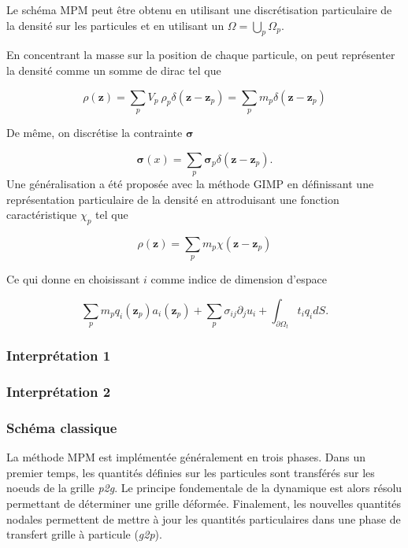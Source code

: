 Le schéma MPM peut être obtenu en utilisant une discrétisation particulaire de la densité sur les particules et en utilisant un  $\Omega = \bigcup_p \Omega_p$.

En concentrant la masse sur la position de chaque particule, on peut représenter la densité comme un somme de dirac tel que

\begin{equation*}
    \rho(\bm z) = \sum_p V_p~\rho_p \delta(\bm z - \bm z_p) = \sum_p m_p \delta(\bm z - \bm z_p)
\end{equation*}

De même, on discrétise la contrainte $\bm \sigma$

\begin{equation*}
    \bm \sigma(x) = \sum_p \bm \sigma_p \delta(\bm z - \bm z_p).
\end{equation*}
Une généralisation a été proposée avec la méthode GIMP \cite{bardenhagen_generalized_2004} en définissant une représentation particulaire de la densité en attroduisant une fonction caractéristique $\chi_p$ tel que

\begin{equation*}
    \rho(\bm z) = \sum_p m_p \chi(\bm z - \bm z_p)
\end{equation*}

Ce qui donne en choisissant $i$ comme indice de dimension d'espace

\begin{equation*}
    \sum_p m_p q_i(\bm z_p) a_i(\bm z_p) + \sum_p \sigma_{ij} \partial_j u_i + \int_{\partial \Omega_t} t_i q_i dS.
\end{equation*}


\subsubsection{Interprétation 1}

\subsubsection{Interprétation 2}

\subsubsection{Schéma classique}

La méthode MPM est implémentée généralement en trois phases. Dans un premier temps, les quantités définies sur les particules sont transférés sur les noeuds de la grille \textit{p2g}. Le principe fondementale de la dynamique est alors résolu permettant de déterminer une grille déformée. Finalement, les nouvelles quantités nodales permettent de mettre à jour les quantités particulaires dans une phase de transfert grille à particule (\textit{g2p}).

